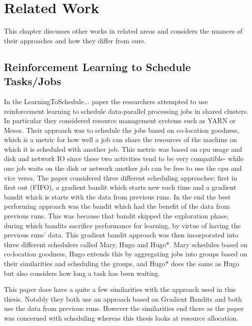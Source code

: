 
\cleardoublepage
\chapter{Related Work}
\label{cha:related_work}

This chapter discusses other works in related areas and considers the nuances of their approaches and how they differ from ours. 

\section{Reinforcement Learning to Schedule Tasks/Jobs}
\label{sec:rl_scheduling}

In the LearningToSchedule... paper the researchers attempted to use reinforcement learning to schedule data-parallel processing jobs in shared clusters. In particular they considered resource management systems such as YARN or Mesos. Their approach was to schedule the jobs based on co-location goodness, which is a metric for how well a job can share the resources of the machine on which it is scheduled with another job. This metric was based on cpu usage and disk and network IO since these two activities tend to be very compatible- while one job waits on the disk or network another job can be free to use the cpu and vice versa. The paper considered three different scheduling approaches: first in first out (FIFO), a gradient bandit which starts new each time and a gradient bandit which is starts with the data from previous runs. In the end the best performing approach was the bandit which had the benefit of the data from previous runs. This was because that bandit skipped the exploration phase, during which bandits sacrifice performance for learning, by virtue of having the previous runs' data. This gradient bandit approach was then incorporated into three different schedulers called Mary, Hugo and Hugo*.  Mary schedules based on co-location goodness, Hugo extends this by aggregating jobs into groups based on their similarities and scheduling the groups, and Hugo* does the same as Hugo but also considers how long a task has been waiting. 

This paper does have a quite a few similarities with the approach used in this thesis. Notably they both use an approach based on Gradient Bandits and both use the data from previous runs. However the similarities end there as the paper was concerned with scheduling whereas this thesis looks at resource allocation. 

